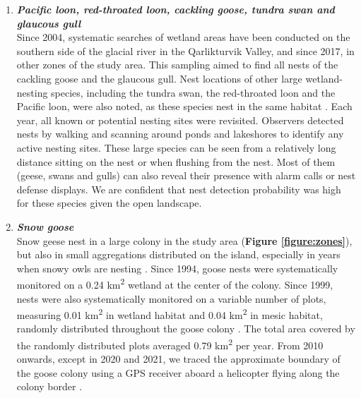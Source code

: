 \documentclass[a4paper,twoside,12pt]{article}
\begin{document}
	\begin{enumerate}[label=\roman*]
	\item[] \textit{\textbf{Pacific loon, red-throated loon, cackling goose, tundra swan and glaucous gull}}\\
	Since 2004, systematic searches of wetland areas have been conducted on the southern side of the glacial river in the Qarlikturvik Valley, and since 2017, in other zones of the study area. This sampling aimed to find all nests of the cackling goose and the glaucous gull. Nest locations of other large wetland-nesting species, including the tundra swan, the red-throated loon and the Pacific loon, were also noted, as these species nest in the same habitat \citep{duchesne2021,gauthier2024a}. Each year, all known or potential nesting sites were revisited. Observers detected nests by walking and scanning around ponds and lakeshores to identify any active nesting sites. These large species can be seen from a relatively long distance sitting on the nest or when flushing from the nest. Most of them (geese, swans and gulls) can also reveal their presence with alarm calls or nest defense displays. We are confident that nest detection probability was high for these species given the open landscape.\\
	
	\item[] \textit{\textbf{Snow goose}}\\
	Snow geese nest in a large colony in the study area (\textbf{Figure \ref{figure:zones}}), but also in small aggregations distributed on the island, especially in years when snowy owls are nesting \citep{lepage1996,reed2002}. Since 1994, goose nests were systematically monitored on a 0.24 km\textsuperscript{2} wetland at the center of the colony. Since 1999, nests were also systematically monitored on a variable number of plots, measuring 0.01 km\textsuperscript{2} in wetland habitat and 0.04 km\textsuperscript{2} in mesic habitat, randomly distributed throughout the goose colony \citep{gauthier2020goose}. The total area covered by the randomly distributed plots averaged 0.79  km\textsuperscript{2} per year. From 2010 onwards, except in 2020 and 2021, we traced the approximate boundary of the goose colony using a GPS receiver aboard a helicopter flying along the colony border \citep{duchesne2021}.
	

\end{enumerate}
\end{document}
